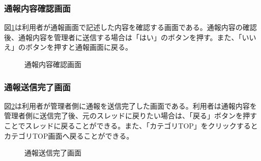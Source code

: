 \documentclass[a4j]{jarticle}
\begin{document}
\subsubsection{通報内容確認画面}
図\ref{fig:report_confirm}は利用者が通報画面で記述した内容を確認する画面である。通報内容の確認後、通報内容を管理者に送信する場合は「はい」のボタンを押す。また、「いいえ」のボタンを押すと通報画面に戻る。
\begin{figure}[H]
\begin{center}
\caption{通報内容確認画面}
\label{fig:report_confirm}
\end{center}
\end{figure}

\subsubsection{通報送信完了画面}
図\ref{fig:report_ok}は利用者が管理者側に通報を送信完了した画面である。利用者は通報内容を管理者側に送信完了後、元のスレッドに戻りたい場合は、「戻る」ボタンを押すことでスレッドに戻ることができる。また、「カテゴリTOP」をクリックするとカテゴリTOP画面へ戻ることができる。
\begin{figure}[H]
\begin{center}
\caption{通報送信完了画面}
\label{fig:report_ok}
\end{center}
\end{figure}
\end{document}
